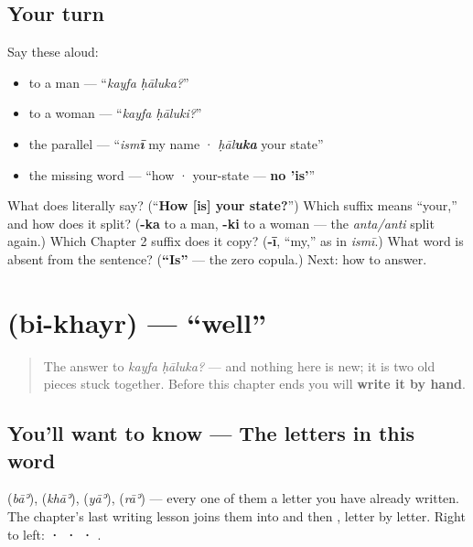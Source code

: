 \subsection*{Your turn}
Say these aloud:

\begin{itemize}
\raggedright
  \item to a man — \textquotedblleft{}\emph{kayfa ḥāluka?}\textquotedblright{}
  \item to a woman — \textquotedblleft{}\emph{kayfa ḥāluki?}\textquotedblright{}
  \item the parallel — \textquotedblleft{}\emph{ism\textbf{ī}} my name · \emph{ḥāl\textbf{uka}} your state\textquotedblright{}
  \item the missing word — \textquotedblleft{}how · your-state — \textbf{no 'is'}\textquotedblright{}
\end{itemize}

\begin{tcolorbox}[breakable,colback=teal!4,colframe=teal!35!black,title={Before you move on}]
What does \textbf{ } literally say? (\textquotedblleft{}\textbf{How {[}is{]} your state?}\textquotedblright{}) Which suffix means \textquotedblleft{}your,\textquotedblright{} and how does it split? (\textbf{-ka} to a man, \textbf{-ki} to a woman — the \emph{anta/anti} split again.) Which Chapter 2 suffix does it copy? (\textbf{-ī}, \textquotedblleft{}my,\textquotedblright{} as in \emph{ismī}.) What word is absent from the sentence? (\textbf{\textquotedblleft{}Is\textquotedblright{}} — the zero copula.) Next: how to answer.
\end{tcolorbox}
\section[\texorpdfstring{\ar{بخير} (bi-khayr)}{بخير (bi-khayr)}]{ (bi-khayr) — \textquotedblleft{}well\textquotedblright{}}

\label{lesson:AR-C03-bi-khayr}



\begin{quote}
The answer to \emph{kayfa ḥāluka?} — and nothing here is new; it is two old pieces stuck together. Before this chapter ends you will \textbf{write it by hand}.
\end{quote}

\subsection*{You'll want to know — The letters in this word}
\textbf{} (\emph{bāʾ}), \textbf{} (\emph{khāʾ}), \textbf{} (\emph{yāʾ}), \textbf{} (\emph{rāʾ}) — every one of them a letter you have already written. The chapter's last writing lesson joins them into \textbf{} and then \textbf{}, letter by letter. Right to left: \textbf{ ·  ·  · }.

